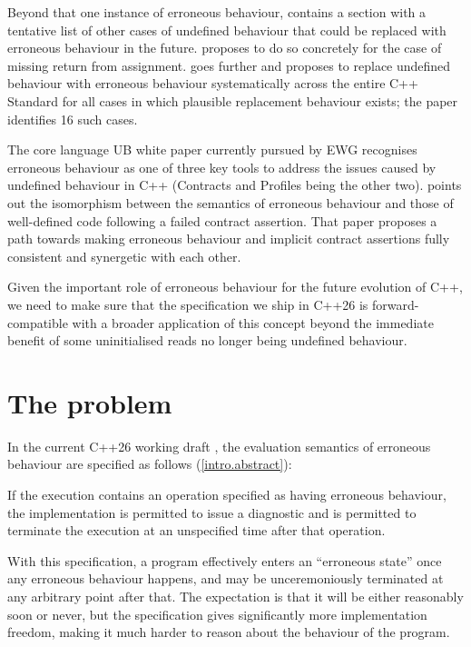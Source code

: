 Beyond that one instance of erroneous behaviour, \cite{P2795R5} contains a section with a tentative list of other cases of undefined behaviour that could be replaced with erroneous behaviour in the future. \cite{P2973R0} proposes to do so concretely for the case of missing return from assignment. \cite{P3100R4} goes further and proposes to replace undefined behaviour with erroneous behaviour systematically across the entire C++ Standard for all cases in which plausible replacement behaviour exists; the paper identifies 16 such cases.

The core language UB white paper \cite{P3656R1} currently pursued by EWG recognises erroneous behaviour as one of three key tools to address the issues caused by undefined behaviour in C++ (Contracts and Profiles being the other two). \cite{P3229R0} points out the isomorphism between the semantics of erroneous behaviour and those of well-defined code following a failed contract assertion. That paper proposes a path towards making erroneous behaviour and implicit contract assertions fully consistent and synergetic with each other.

Given the important role of erroneous behaviour for the future evolution of C++, we need to make sure that the specification we ship in C++26 is forward-compatible with a broader application of this concept beyond the immediate benefit of some uninitialised reads no longer being undefined behaviour.

\section{The problem}

In the current C++26 working draft \cite{N5014}, the evaluation semantics of erroneous behaviour are specified as follows (\href{https://eel.is/c++draft/intro.abstract#6.sentence-5}{[intro.abstract]}):
\begin{adjustwidth}{0.5cm}{0.5cm}
If the execution contains an operation specified as having erroneous behaviour, the implementation is permitted to issue a diagnostic and is permitted to terminate the execution at an unspecified time after that operation.
\end{adjustwidth} 
With this specification, a program effectively enters an ``erroneous state'' once any erroneous behaviour happens, and may be unceremoniously terminated at any arbitrary point after that.  The expectation is that it will be either reasonably soon or never, but the specification gives significantly more implementation freedom, making it much harder to reason about the behaviour of the program.

